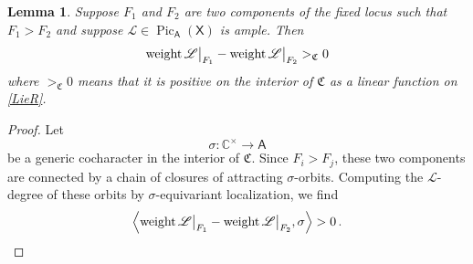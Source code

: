 \documentclass[14pt]{extarticle}
\newcommand{\task}[1]{\bigskip\noindent
  \boxed{\texttt{#1}}\bigskip}
\newcommand{\C}{\mathbb{C}}
\newcommand{\Ct}{\mathbb{C}^\times}
\newcommand{\Z}{\mathbb{Z}}
\newcommand{\bT}{\mathsf{T}}
\newcommand{\bA}{\mathsf{A}}
\newcommand{\bZ}{\mathsf{Z}}
\newcommand{\bX}{\mathsf{X}}
\newcommand{\cL}{\mathscr{L}}
\newcommand{\cE}{\mathscr{E}}
\newcommand{\cB}{\mathscr{B}}
\newcommand{\FM}{\mathsf{FM}}
\newcommand{\cH}{\mathscr{H}}
\newcommand{\fC}{\mathfrak{C}}
\newcommand{\cO}{\mathscr{O}}
\newcommand{\idz}{1_{\cE_\bZ}}
\DeclareMathOperator{\Pic}{Pic}
\newtheorem{Lemma}{Lemma}[section]
\theoremstyle{definition}
\begin{document}




\subsubsection{}



\begin{Lemma}\label{l_weight} 
Suppose $F_1$ and $F_2$ are two components of the fixed locus such
that $F_1 > F_2$ and suppose $\cL \in \Pic_\bA(\bX)$ is ample. Then
%
\begin{equation}
\textup{weight} \, \cL \big|_{F_1} - \textup{weight} \, \cL\big|_{F_2}
>_{\fC} 0\label{weightL}
\end{equation}
%
where $>_{\fC} 0$ means that it is positive on the 
interior of $\fC$ as a linear function on \eqref{LieR}. 
\end{Lemma}

\begin{proof}
 Let 
$$
\sigma: \Ct \to \bA
$$
be a generic cocharacter in the interior of $\fC$. 
Since $F_i > F_j$, these two components are connected by a chain of closures of
attracting $\sigma$-orbits. Computing the $\cL$-degree of these orbits
by $\sigma$-equivariant localization, we find
$$
\left\langle \textup{weight} \, \cL \big|_{F_1} - \textup{weight} \,
\cL\big|_{F_2}, \sigma \right\rangle > 0 \,.
$$
\end{proof}
\end{document}
